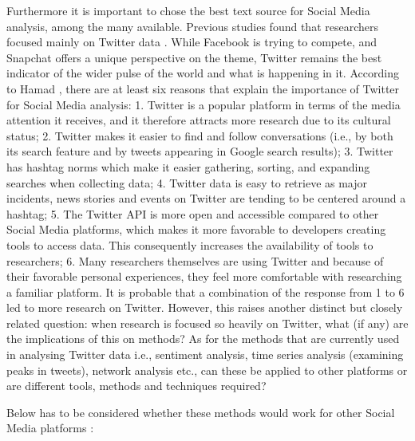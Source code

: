 \documentclass[]{book}
\theoremstyle{definition}
\theoremstyle{definition}
\theoremstyle{definition}
\theoremstyle{remark}
\begin{document}
Furthermore it is important to chose the best text source for Social
Media analysis, among the many available. Previous studies found that
researchers focused mainly on Twitter data \citep{ossola2018}. While
Facebook is trying to compete, and Snapchat offers a unique perspective
on the theme, Twitter remains the best indicator of the wider pulse of
the world and what is happening in it. According to Hamad
\citep{ahmed2017using}, there are at least six reasons that explain the
importance of Twitter for Social Media analysis: 1. Twitter is a popular
platform in terms of the media attention it receives, and it therefore
attracts more research due to its cultural status; 2. Twitter makes it
easier to find and follow conversations (i.e., by both its search
feature and by tweets appearing in Google search results); 3. Twitter
has hashtag norms which make it easier gathering, sorting, and expanding
searches when collecting data; 4. Twitter data is easy to retrieve as
major incidents, news stories and events on Twitter are tending to be
centered around a hashtag; 5. The Twitter API is more open and
accessible compared to other Social Media platforms, which makes it more
favorable to developers creating tools to access data. This consequently
increases the availability of tools to researchers; 6. Many researchers
themselves are using Twitter and because of their favorable personal
experiences, they feel more comfortable with researching a familiar
platform. It is probable that a combination of the response from 1 to 6
led to more research on Twitter. However, this raises another distinct
but closely related question: when research is focused so heavily on
Twitter, what (if any) are the implications of this on methods? As for
the methods that are currently used in analysing Twitter data i.e.,
sentiment analysis, time series analysis (examining peaks in tweets),
network analysis etc., can these be applied to other platforms or are
different tools, methods and techniques required?

Below has to be considered whether these methods would work for other
Social Media platforms \citep{ahmed2017using}:
\end{document}
